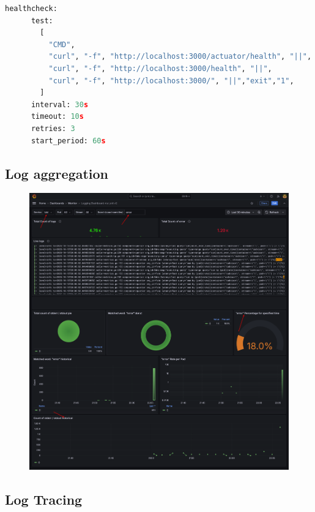 \begin{lstlisting}[language=Python, caption={Health check API}, label=list:healt_API]
    healthcheck:
      test:
        [
          "CMD", 
          "curl", "-f", "http://localhost:3000/actuator/health", "||", 
          "curl", "-f", "http://localhost:3000/health", "||", 
          "curl", "-f", "http://localhost:3000/", "||","exit","1",
        ]
      interval: 30s
      timeout: 10s
      retries: 3
      start_period: 60s
\end{lstlisting}

\subsection{Log aggregation}

 \begin{figure}[!htb]
    \centering 
    \includegraphics[width=16cm]{report/img/dashboard-aggregate-logging.png}
    \caption{}
    \label{log_aggregation}
\end{figure}

\newpage
\subsection{Log Tracing}

